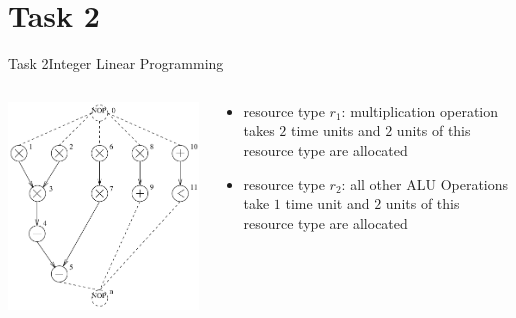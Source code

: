 
\section{Task 2}

\begin{frame}[allowframebreaks]{Task 2}{Integer Linear Programming}
  \begin{tasknoinc}
    \begin{columns}
      \begin{column}{.5\textwidth}
        \centering
        \includegraphics[height=.6\paperheight]{./figures/task2_sequence_graph.png}
      \end{column}
      \begin{column}{.5\textwidth}
        \begin{itemize}
          \item \alert{resource type $r_1$:} multiplication operation takes $2$ time units and $2$ units of this resource type are allocated
          \item \alert{resource type $r_2$:} all other ALU Operations take $1$ time unit and $2$ units of this resource type are allocated
        \end{itemize}
      \end{column}

\end{columns}
\end{tasknoinc}
\end{frame}
